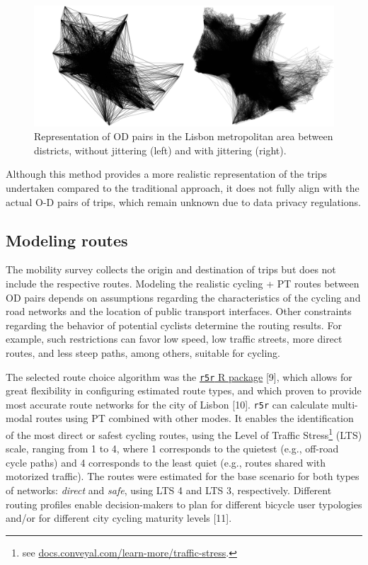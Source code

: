 \documentclass[runningheads]{llncs}
\begin{document}
\begin{figure}

{\centering \includegraphics[width=1\linewidth,]{img/jitter} 

}

\caption{Representation of OD pairs in the Lisbon metropolitan area between districts, without jittering (left) and with jittering (right).}\label{fig:jitter}
\end{figure}

Although this method provides a more realistic representation of the
trips undertaken compared to the traditional approach, it does not fully
align with the actual O-D pairs of trips, which remain unknown due to
data privacy regulations.

\hypertarget{modeling-routes}{%
\subsection{Modeling routes}\label{modeling-routes}}

The mobility survey collects the origin and destination of trips but
does not include the respective routes. Modeling the realistic cycling +
PT routes between OD pairs depends on assumptions regarding the
characteristics of the cycling and road networks and the location of
public transport interfaces. Other constraints regarding the behavior of
potential cyclists determine the routing results. For example, such
restrictions can favor low speed, low traffic streets, more direct
routes, and less steep paths, among others, suitable for cycling.

The selected route choice algorithm was the
\href{https://ipeagit.github.io/r5r/}{\texttt{r5r} R package} {[}9{]},
which allows for great flexibility in configuring estimated route types,
and which proven to provide most accurate route networks for the city of
Lisbon {[}10{]}. \texttt{r5r} can calculate multi-modal routes using PT
combined with other modes. It enables the identification of the most
direct or safest cycling routes, using the Level of Traffic
Stress\footnote{see
  \href{https://docs.conveyal.com/learn-more/traffic-stress}{docs.conveyal.com/learn-more/traffic-stress}.}
(LTS) scale, ranging from 1 to 4, where 1 corresponds to the quietest
(e.g., off-road cycle paths) and 4 corresponds to the least quiet (e.g.,
routes shared with motorized traffic). The routes were estimated for the
base scenario for both types of networks: \emph{direct} and \emph{safe},
using LTS 4 and LTS 3, respectively. Different routing profiles enable
decision-makers to plan for different bicycle user typologies and/or for
different city cycling maturity levels {[}11{]}.
\end{document}

